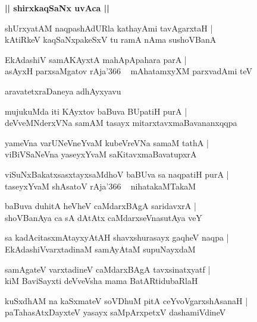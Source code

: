 \documentclass[twoside,12pt,openright]{book}
\newcounter{shloka}[chapter]
\def\uvaca#1{\centerline{{\large\textbf{#1}}}}
\begin{document}
\uvaca{|| shirxkaqSaNx uvAca ||}

\begin{shloka}%
shUrxyatAM naqpashAdURla kathayAmi tavAgarxtaH |\\
kAtiRkeV kaqSaNxpakeSxV tu ramA nAma sushoVBanA 
\end{shloka}

\begin{shloka}%
EkAdashiV samAKAyxtA mahApApahara parA |\\
asAyxH parxsaMgatov rAja\char'366 ~ mAhatamxyXM parxvadAmi teV 
\end{shloka}

\begin{center}
aravatetxraDaneya adhAyxyavu
\end{center}

\begin{shloka}%
mujukuMda iti KAyxtov baBuva BUpatiH purA |\\
deVveMNderxVNa samAM tasayx mitarxtavxmaBavananxqqpa 
\end{shloka}

\begin{shloka}%
yameVna varUNeVneYvaM kubeVreVNa samaM tathA |\\
viBiVSaNeVna yaseyxYvaM saKitavxmaBavatupxrA 
\end{shloka}

\begin{shloka}%
viSuNxBakatxsasxtayxsaMdhoV baBUva sa naqpatiH purA |\\
taseyxYvaM shAsatoV rAja\char'366 ~ nihatakaMTakaM 
\end{shloka}

\begin{shloka}%
baBuva duhitA heVheV caMdarxBAgA saridavxrA |\\
shoVBanAya ca sA dAtAtx caMdarxseVnasutAya veY
\end{shloka}

\begin{shloka}%
sa kadAcitasxmAtayxyAtAH shavxshurasayx gaqheV naqpa |\\
EkAdashiVvarxtadinaM samAyAtaM supuNayxdaM
\end{shloka}

\begin{shloka}%
samAgateV varxtadineV caMdarxBAgA tavxsinatxyatf |\\
kiM BaviSayxti deVveVsha mama BatARtidubaRlaH 
\end{shloka}

\begin{shloka}%
kuSxdhAM na kaSxmateV soVDhuM pitA ceYvoVgarxshAsanaH |\\
paTahasAtxDayxteV yasayx saMpArxpetxV dashamiVdineV 
\end{shloka}
\end{document}
